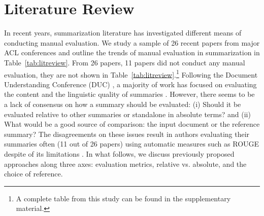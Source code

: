 \documentclass[11pt,a4paper]{article}
\begin{document}
\section{Literature Review}
\label{sec:review}

In recent years, summarization literature has investigated different means of conducting manual evaluation. We study a sample of 26 recent papers from major ACL conferences and outline the trends of manual evaluation in summarization in Table~\ref{tab:litreview}. From 26 papers, 11 papers \citep[e.g.,][]{See2017,Kedzie2018,Cao2018a} did not conduct any manual evaluation, they are not shown in Table~\ref{tab:litreview}.\footnote{A complete table from this study can be found in the supplementary material.}  Following the Document Understanding Conference (DUC) \citep{dang2005overview}, a majority of work has focused on evaluating the content and the linguistic quality of summaries \cite{Nenkova:2005:ATS}. However, there seems to be a lack of consensus on how a summary should be evaluated: (i) Should it be evaluated relative to other summaries or standalone in absolute terms? and (ii) What would be a good source of comparison: the input document or the reference summary? The disagreements on these issues result in authors evaluating their summaries often (11 out of 26 papers) using automatic measures such as ROUGE \cite{Lin2004} despite of its limitations \cite{schluter:2017:EACLshort}. 
In what follows, we discuss previously proposed %
approaches along three axes: evaluation metrics, relative vs. absolute, and the choice of reference.
\end{document}
